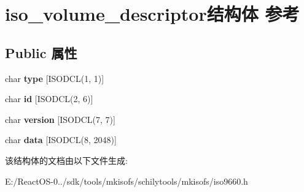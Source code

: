 \hypertarget{structiso__volume__descriptor}{}\section{iso\+\_\+volume\+\_\+descriptor结构体 参考}
\label{structiso__volume__descriptor}
\subsection*{Public 属性}
\begin{DoxyCompactItemize}
\item 
\mbox{\label{structiso__volume__descriptor_a477d4cf266f6c97c5a4f546c296fe545}} 
char {\bfseries type} \mbox{[}I\+S\+O\+D\+CL(1, 1)\mbox{]}
\item 
\mbox{\label{structiso__volume__descriptor_a864a6e42e486c1eedf4f84e1b8e270e6}} 
char {\bfseries id} \mbox{[}I\+S\+O\+D\+CL(2, 6)\mbox{]}
\item 
\mbox{\label{structiso__volume__descriptor_adf2e12e51b73ef53e2f9aa6f9e91905e}} 
char {\bfseries version} \mbox{[}I\+S\+O\+D\+CL(7, 7)\mbox{]}
\item 
\mbox{\label{structiso__volume__descriptor_af6d8013513213397521467f649b38d96}} 
char {\bfseries data} \mbox{[}I\+S\+O\+D\+CL(8, 2048)\mbox{]}
\end{DoxyCompactItemize}


该结构体的文档由以下文件生成\+:\begin{DoxyCompactItemize}
\item 
E\+:/\+React\+O\+S-\/0../sdk/tools/mkisofs/schilytools/mkisofs/iso9660.\+h\end{DoxyCompactItemize}
